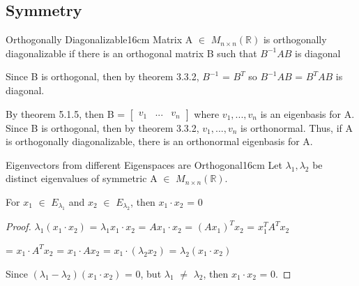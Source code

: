     \newpage



    

\subsection{ Symmetry }

    \begin{definition}{Orthogonally Diagonalizable}{16cm}
        Matrix A $\in$ $M_{n \times n}(\mathbb{R})$ is
        {\color{lblue} orthogonally diagonalizable} if there is
        an orthogonal matrix B such that $B^{-1}AB$ is diagonal

        \vspace{0.3cm}

        Since B is orthogonal, then by {\color{red} theorem 3.3.2},
        $B^{-1}$ = $B^T$ so $B^{-1}AB$ = $B^TAB$ is diagonal.

        By {\color{red} theorem 5.1.5}, then B =
        $\begin{bmatrix}
            v_1 & ... & v_n
        \end{bmatrix}$
        where $v_1,...,v_n$ is an eigenbasis for A.
        Since B is orthogonal, then by {\color{red} theorem 3.3.2},
        $v_1,...,v_n$ is orthonormal.
        Thus, if A is orthogonally diagonalizable,
        there is an orthonormal eigenbasis for A.
    \end{definition}

    \vspace{0.5cm}



    \begin{wtheorem}{Eigenvectors from different Eigenspaces are Orthogonal}{16cm}
        Let $\lambda_1,\lambda_2$ be distinct eigenvalues of
        symmetric A $\in$ $M_{n \times n}(\mathbb{R})$.

        For $x_1$ $\in$ $E_{\lambda_1}$ and $x_2$ $\in$ $E_{\lambda_2}$,
        then $x_1 \cdot x_2$ = 0
    \end{wtheorem}

    \begin{proof}
        $\lambda_1(x_1 \cdot x_2)$
        = $\lambda_1x_1 \cdot x_2$
        = $Ax_1 \cdot x_2$
        = $(Ax_1)^Tx_2$
        = $x_1^TA^Tx_2$

        \hspace{1.8cm}
        = $x_1 \cdot A^Tx_2$
        = $x_1 \cdot Ax_2$
        = $x_1 \cdot (\lambda_2x_2)$
        = $\lambda_2(x_1 \cdot x_2)$

        Since $(\lambda_1-\lambda_2)(x_1 \cdot x_2)$ = 0,
        but $\lambda_1$ $\not =$ $\lambda_2$, then $x_1 \cdot x_2$ = 0.
    \end{proof}


